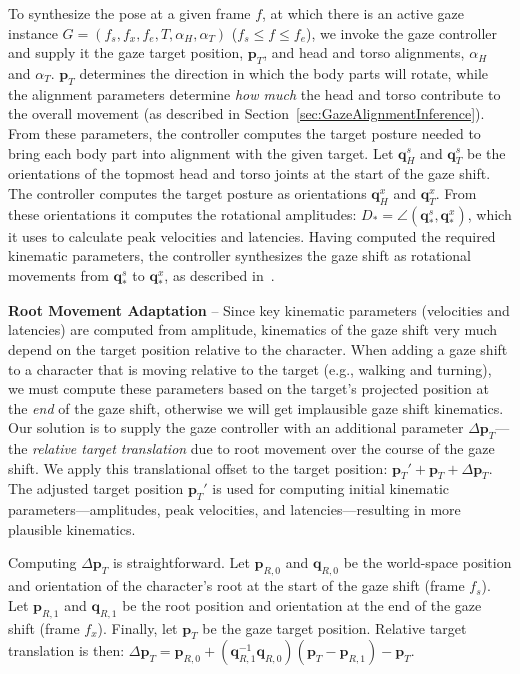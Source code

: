 To synthesize the pose at a given frame $f$, at which there is an active gaze instance $G = (f_s, f_x, f_e, T, \alpha_{H}, \alpha_{T})$ ($f_s \leq f \leq f_e$), we invoke the gaze controller and supply it the gaze target position, $\mathbf{p}_T$, and head and torso alignments, $\alpha_H$ and $\alpha_T$. $\mathbf{p}_T$ determines the direction in which the body parts will rotate, while the alignment parameters determine \emph{how much} the head and torso contribute to the overall movement (as described in Section~\ref{sec:GazeAlignmentInference}). From these parameters, the controller computes the target posture needed to bring each body part into alignment with the given target. Let $\mathbf{q}_H^s$ and $\mathbf{q}_T^s$ be the orientations of the topmost head and torso joints at the start of the gaze shift. The controller computes the target posture as orientations $\mathbf{q}_H^x$ and $\mathbf{q}_T^x$. From these orientations it computes the rotational amplitudes: $D_* = \angle(\mathbf{q}_*^s, \mathbf{q}_*^x)$, which it uses to calculate peak velocities and latencies. Having computed the required kinematic parameters, the controller synthesizes the gaze shift as rotational movements from $\mathbf{q}_*^s$ to $\mathbf{q}_*^x$, as described in~\cite{pejsa2015gaze}.

\noindent\textbf{Root Movement Adaptation} -- Since key kinematic parameters (velocities and latencies) are computed from amplitude, kinematics of the gaze shift very much depend on the target position relative to the character. When adding a gaze shift to a character that is moving relative to the target (e.g., walking and turning), we must compute these parameters based on the target's projected position at the \emph{end} of the gaze shift, otherwise we will get implausible gaze shift kinematics. Our solution is to supply the gaze controller with an additional parameter $\Delta \mathbf{p}_T$---the \emph{relative target translation} due to root movement over the course of the gaze shift. We apply this translational offset to the target position: $\mathbf{p}_T' + \mathbf{p}_T + \Delta \mathbf{p}_T$. The adjusted target position $\mathbf{p}_T'$ is used for computing initial kinematic parameters---amplitudes, peak velocities, and latencies---resulting in more plausible kinematics.

Computing $\Delta \mathbf{p}_T$ is straightforward. Let $\mathbf{p}_{R,0}$ and $\mathbf{q}_{R,0}$ be the world-space position and orientation of the character's root at the start of the gaze shift (frame $f_s$). Let $\mathbf{p}_{R,1}$ and $\mathbf{q}_{R,1}$ be the root position and orientation at the end of the gaze shift (frame $f_x$). Finally, let $\mathbf{p}_T$ be the gaze target position. Relative target translation is then: $\Delta \mathbf{p}_T = \mathbf{p}_{R,0} + (\mathbf{q}_{R,1}^{-1} \mathbf{q}_{R,0}) (\mathbf{p}_T - \mathbf{p}_{R,1}) - \mathbf{p}_T$.

